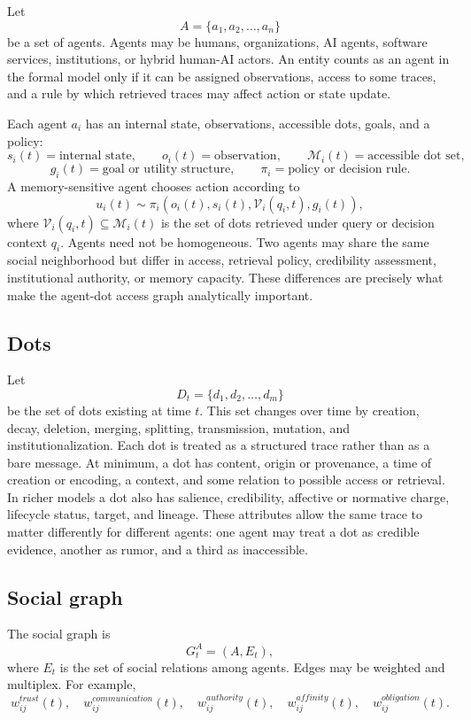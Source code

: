 \documentclass[11pt]{article}
\theoremstyle{remark}
\begin{document}
Let
\[
A = \{a_1,a_2,\ldots,a_n\}
\]
be a set of agents. Agents may be humans, organizations, AI agents, software services, institutions, or hybrid human-AI actors. An entity counts as an agent in the formal model only if it can be assigned observations, access to some traces, and a rule by which retrieved traces may affect action or state update.

Each agent \(a_i\) has an internal state, observations, accessible dots, goals, and a policy:
\[
s_i(t)=\text{internal state},\qquad
o_i(t)=\text{observation},\qquad
\mathcal M_i(t)=\text{accessible dot set},
\]
\[
g_i(t)=\text{goal or utility structure},\qquad
\pi_i=\text{policy or decision rule}.
\]
A memory-sensitive agent chooses action according to
\[
u_i(t)\sim \pi_i(o_i(t),s_i(t),\mathcal V_i(q_i,t),g_i(t)),
\]
where \(\mathcal V_i(q_i,t)\subseteq \mathcal M_i(t)\) is the set of dots retrieved under query or decision context \(q_i\). Agents need not be homogeneous. Two agents may share the same social neighborhood but differ in access, retrieval policy, credibility assessment, institutional authority, or memory capacity. These differences are precisely what make the agent-dot access graph analytically important.

\subsection{Dots}\label{dots}

Let
\[
D_t = \{d_1,d_2,\ldots,d_m\}
\]
be the set of dots existing at time \(t\). This set changes over time by creation, decay, deletion, merging, splitting, transmission, mutation, and institutionalization. Each dot is treated as a structured trace rather than as a bare message. At minimum, a dot has content, origin or provenance, a time of creation or encoding, a context, and some relation to possible access or retrieval. In richer models a dot also has salience, credibility, affective or normative charge, lifecycle status, target, and lineage. These attributes allow the same trace to matter differently for different agents: one agent may treat a dot as credible evidence, another as rumor, and a third as inaccessible.

\subsection{Social graph}\label{social-graph}

The social graph is \[
G^A_t = (A,E_t),
\] where \(E_t\) is the set of social relations among agents. Edges may
be weighted and multiplex. For example, \[
w_{ij}^{trust}(t), \quad w_{ij}^{communication}(t), \quad w_{ij}^{authority}(t), \quad w_{ij}^{affinity}(t), \quad w_{ij}^{obligation}(t).
\]
\end{document}
